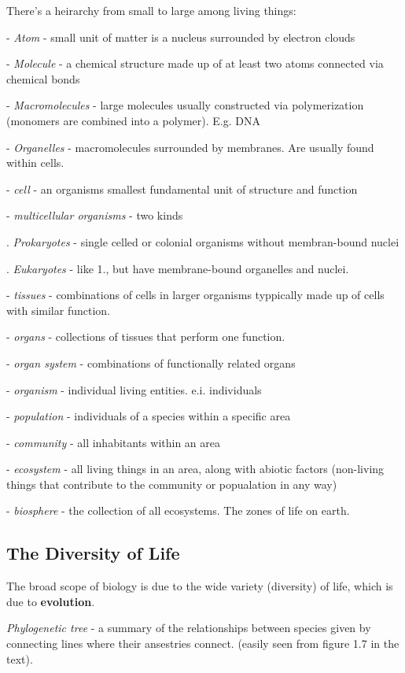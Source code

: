 \documentclass{article}
\theoremstyle{definition}
\begin{document}
There's a heirarchy from small to large among living things:

- \textit{Atom} - small unit of matter is a nucleus surrounded by electron clouds

- \textit{Molecule} - a chemical structure made up of at least two atoms connected via chemical bonds

- \textit{Macromolecules} - large molecules usually constructed via polymerization (monomers are combined into a polymer). E.g. DNA

- \textit{Organelles} - macromolecules surrounded by membranes. Are usually found within cells.

- \textit{cell} - an organisms smallest fundamental unit of structure and function

- \textit{multicellular organisms} - two kinds

\indent{}. \textit{Prokaryotes} - single celled or colonial organisms without membran-bound nuclei

\indent{}. \textit{Eukaryotes} - like 1., but have membrane-bound organelles and nuclei.

- \textit{tissues} - combinations of cells in larger organisms typpically made up of cells with similar function.

- \textit{organs} - collections of tissues that perform one function.

- \textit{organ system} - combinations of functionally related organs

- \textit{organism} - individual living entities. e.i. individuals

- \textit{population} - individuals of a species within a specific area

- \textit{community} - all inhabitants within an area

- \textit{ecosystem} - all living things in an area, along with abiotic factors (non-living things that contribute to the community or popualation in any way)

- \textit{biosphere} -  the collection of all ecosystems. The zones of life on earth.

\subsection{The Diversity of Life}

The broad scope of biology is due to the wide variety (diversity) of life, which is due to \textbf{evolution}.

 \textit{Phylogenetic tree} - a summary of the relationships between species given by connecting lines  where their ansestries connect. (easily seen from figure 1.7 in the text).
\end{document}
